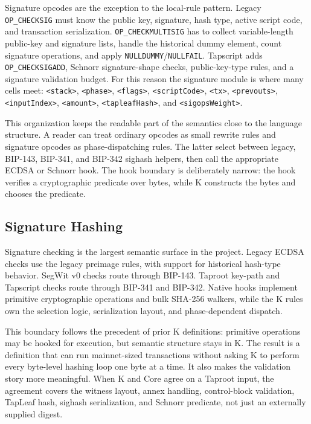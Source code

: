 \documentclass[conference]{IEEEtran}
\newcommand{\kcell}[1]{\texttt{<#1>}\xspace}
\begin{document}
Signature opcodes are the exception to the local-rule pattern.  Legacy
\texttt{OP\_CHECKSIG} must know the public key, signature, hash type, active
script code, and transaction serialization.  \texttt{OP\_CHECKMULTISIG} has
to collect variable-length public-key and signature lists, handle the
historical dummy element, count signature operations, and apply
\texttt{NULLDUMMY}/\texttt{NULLFAIL}.  Tapscript adds
\texttt{OP\_CHECKSIGADD}, Schnorr signature-shape checks, public-key-type
rules, and a signature validation budget.  For this reason the signature
module is where many cells meet: \kcell{stack}, \kcell{phase}, \kcell{flags},
\kcell{scriptCode}, \kcell{tx}, \kcell{prevouts}, \kcell{inputIndex},
\kcell{amount}, \kcell{tapleafHash}, and \kcell{sigopsWeight}.

This organization keeps the readable part of the semantics close to the
language structure.  A reader can treat ordinary opcodes as small rewrite
rules and signature opcodes as phase-dispatching rules.  The latter select
between legacy, BIP-143, BIP-341, and BIP-342 sighash helpers, then call the
appropriate ECDSA or Schnorr hook.  The hook boundary is deliberately narrow:
the hook verifies a cryptographic predicate over bytes, while K constructs the
bytes and chooses the predicate.

\subsection{Signature Hashing}

Signature checking is the largest semantic surface in the project.  Legacy
ECDSA checks use the legacy preimage rules, with support for historical
hash-type behavior.  SegWit v0 checks route through BIP-143.  Taproot key-path
and Tapscript checks route through BIP-341 and BIP-342.  Native hooks implement
primitive cryptographic operations and bulk SHA-256 walkers, while the K rules
own the selection logic, serialization layout, and phase-dependent dispatch.

This boundary follows the precedent of prior K definitions: primitive
operations may be hooked for execution, but semantic structure stays in K.  The
result is a definition that can run mainnet-sized transactions without asking K
to perform every byte-level hashing loop one byte at a time.  It also makes
the validation story more meaningful.  When K and Core agree on a Taproot
input, the agreement covers the witness layout, annex handling, control-block
validation, TapLeaf hash, sighash serialization, and Schnorr predicate, not
just an externally supplied digest.
\end{document}

